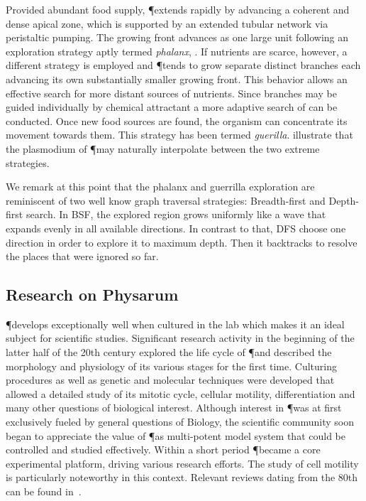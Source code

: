		Provided abundant food supply, \P extends rapidly by advancing a coherent and dense apical zone, which is supported by an extended tubular network via peristaltic pumping. The growing front advances as one large unit following an exploration strategy aptly termed \emph{phalanx}, . If nutrients are scarce, however, a different strategy is employed and \P tends to grow separate distinct branches each advancing its own substantially smaller growing front. This behavior allows an effective search for more distant sources of nutrients. Since branches may be guided individually by chemical attractant a more adaptive search of can be conducted. Once new food sources are found, the organism can concentrate its movement towards them. This strategy has been termed \emph{guerilla}.  illustrate that the plasmodium of \P may naturally interpolate between the two extreme strategies.

		We remark at this point that the phalanx and guerrilla exploration are reminiscent of two well know graph traversal strategies: Breadth-first and Depth-first search. In BSF, the explored region grows uniformly like a wave that expands evenly in all available directions. In contrast to that, DFS choose one direction in order to explore it to maximum depth. Then it backtracks to resolve the places that were ignored so far.


	\subsection{Research on Physarum}

		\P develops exceptionally well when cultured in the lab which makes it an ideal subject for scientific studies. Significant research activity in the beginning of the latter half of the 20th century explored the life cycle of \P and described the morphology and physiology of its various stages for the first time. Culturing procedures as well as genetic and molecular techniques were developed that allowed a detailed study of its mitotic cycle, cellular motility, differentiation and many other questions of biological interest. Although interest in \P was at first exclusively fueled by general questions of Biology, the scientific community soon began to appreciate the value of \P as multi-potent model system that could be controlled and studied effectively. Within a short period \P became a core experimental platform, driving various research efforts. The study of cell motility is particularly noteworthy in this context. Relevant reviews dating from the 80th can be found in~\cite{dove1980growth, aldrich2012cell,sauer1982developmental,Sauer1986}.

